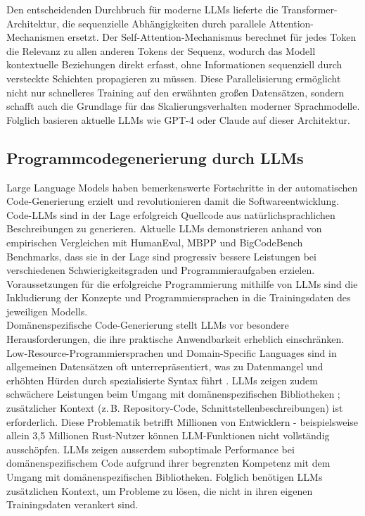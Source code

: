 \noindent Den entscheidenden Durchbruch für moderne LLMs lieferte die
Transformer-Architektur, die sequenzielle Abhängigkeiten durch parallele
Attention-Mechanismen ersetzt. Der
Self-Attention-Mechanismus berechnet für jedes Token die Relevanz zu allen
anderen Tokens der Sequenz, wodurch das Modell kontextuelle Beziehungen direkt
erfasst, ohne Informationen sequenziell durch versteckte Schichten propagieren
zu müssen. Diese Parallelisierung ermöglicht nicht nur schnelleres Training auf
den erwähnten großen Datensätzen, sondern schafft auch die Grundlage für das
Skalierungsverhalten moderner Sprachmodelle. Folglich basieren aktuelle LLMs wie
GPT-4 oder Claude auf dieser Architektur.

\subsection{Programmcodegenerierung durch LLMs}%
Large Language Models haben bemerkenswerte Fortschritte in der automatischen
Code-Generierung erzielt und revolutionieren damit die Softwareentwicklung.
Code-LLMs sind in der Lage erfolgreich Quellcode aus natürlichsprachlichen
Beschreibungen zu generieren. Aktuelle LLMs demonstrieren anhand von
empirischen Vergleichen mit HumanEval, MBPP und BigCodeBench Benchmarks, dass
sie in der Lage sind progressiv bessere Leistungen bei verschiedenen
Schwierigkeitsgraden und Programmieraufgaben erzielen. 
Voraussetzungen für die erfolgreiche Programmierung mithilfe von LLMs sind die
Inkludierung der Konzepte und Programmiersprachen in die Trainingsdaten des
jeweiligen Modells.\\

\noindent Domänenspezifische Code-Generierung stellt LLMs vor besondere
Herausforderungen, die ihre praktische Anwendbarkeit erheblich einschränken.
Low-Resource-Programmiersprachen und Domain-Specific Languages sind in
allgemeinen Datensätzen oft unterrepräsentiert, was zu Datenmangel und erhöhten
Hürden durch spezialisierte Syntax führt . LLMs zeigen
zudem schwächere Leistungen beim Umgang mit domänenspezifischen Bibliotheken
; zusätzlicher Kontext (z.\,B. Repository-Code,
Schnittstellenbeschreibungen) ist erforderlich. Diese Problematik betrifft
Millionen von Entwicklern - beispielsweise allein 3,5 Millionen Rust-Nutzer
können LLM-Funktionen nicht vollständig ausschöpfen. LLMs zeigen ausserdem
suboptimale Performance bei domänenspezifischem Code aufgrund ihrer begrenzten
Kompetenz mit dem Umgang mit domänenspezifischen Bibliotheken.
 Folglich benötigen LLMs zusätzlichen Kontext, um Probleme zu
lösen, die nicht in ihren eigenen Trainingsdaten verankert sind.\\

